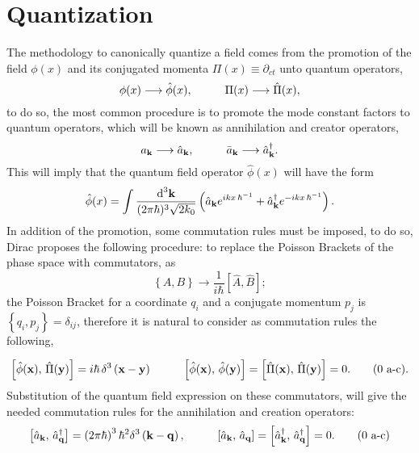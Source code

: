\section*{Quantization}
The methodology to canonically quantize a field comes from the promotion of the field $\phi(x)$ and its conjugated momenta $\Pi(x)\equiv\partial_{ct}$ unto quantum operators,
\begin{equation*}
	\phi(x)\longrightarrow\hat{\phi}(x),\hspace{1.0cm}\Pi(x)\longrightarrow\hat{\Pi}(x),
\end{equation*}
to do so, the most common procedure is to promote the mode constant factors to quantum operators, which will be known as annihilation and creator operators, 
\begin{equation*}
	a_\mathbf{k}\longrightarrow\hat{a}_\mathbf{k},\hspace{1.0cm}\bar a_\mathbf{k}\longrightarrow\hat{a}_\mathbf{k}^\dagger.
\end{equation*}
This will imply that the quantum field operator $\hat{\phi}(x)$ will have the form
\begin{equation}
	\hat\phi(x)=\int\frac{\text{d}^3\mathbf{k}}{(2\pi\hbar)^3\sqrt{2k_0}}\left(\hat a_\mathbf{k}e^{ikx\,\hbar^{-1}}+ \hat a_\mathbf{k}^\dagger e^{-ikx\,\hbar^{-1}}\right).
\end{equation}
In addition of the promotion, some commutation rules must be imposed, to do so, Dirac proposes the following procedure: to replace the Poisson Brackets of the phase space with commutators, as
\begin{equation}
	\left\{A,B\right\}\to\frac{1}{i\hbar}\left[\hat{A},\hat{B}\right];
\end{equation}
the Poisson Bracket for a coordinate $q_i$ and a conjugate momentum $p_j$ is $\left\{q_i,p_j\right\}=\delta_{ij}$, therefore it is natural to consider as commutation rules the following,


\begin{subequations}
	\begin{gather}
		\left[\hat{\phi}(\mathbf{x}),\,\hat{\Pi}(\mathbf{y})\right]=i\hbar \,\delta^3\left(\mathbf{x}-\mathbf{y}\right)\hspace{1.0cm}\left[\hat{\phi}(\mathbf{x}),\,\hat{\phi}(\mathbf{y})\right]=\left[\hat{\Pi}(\mathbf{x}),\,\hat{\Pi}(\mathbf{y})\right]=0.\tag{\theequation \,\,a-c}.
	\end{gather}
\end{subequations}
Substitution of the quantum field expression on these commutators, will give the needed commutation rules for the annihilation and creation operators:
\begin{subequations}\label{eq: general a operator commutator rules}
	\begin{gather}
		\left[\hat{a}_\mathbf{k},\,\hat{a}_\mathbf{q}^\dagger\right]=\left(2\pi\hbar\right)^3\hbar^2 \delta^3\left(\mathbf{k}-\mathbf{q}\right),\hspace{1.0cm}\left[\hat{a}_\mathbf{k},\,\hat{a}_\mathbf{q}\right]=\left[\hat{a}_\mathbf{k}^\dagger,\,\hat{a}_\mathbf{q}^\dagger\right]=0.\tag{\theequation \,\,a-c}
	\end{gather}
\end{subequations}
